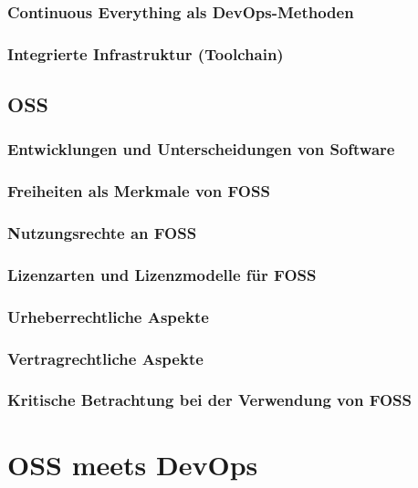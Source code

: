 \documentclass[12pt,titlepage]{article}
\begin{document}
\subsubsection{Continuous Everything als DevOps-Methoden}


\subsubsection{Integrierte Infrastruktur (Toolchain)}



\subsection{OSS}


\subsubsection{Entwicklungen und Unterscheidungen von Software}
\subsubsection{Freiheiten als Merkmale von FOSS}
\subsubsection{Nutzungsrechte an FOSS}
\subsubsection{Lizenzarten und Lizenzmodelle für FOSS}
\subsubsection{Urheberrechtliche Aspekte}
\subsubsection{Vertragrechtliche Aspekte}
\subsubsection{Kritische Betrachtung bei der Verwendung von FOSS}



\section{OSS meets DevOps}

\end{document}

